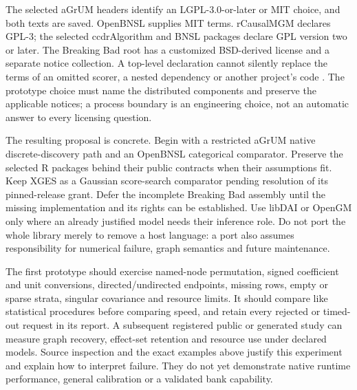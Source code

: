The selected aGrUM headers identify an LGPL-3.0-or-later or MIT choice, and
both texts are saved. OpenBNSL supplies MIT terms. rCausalMGM declares GPL-3;
the selected ccdrAlgorithm and BNSL packages declare GPL version two or
later. The Breaking Bad root has a customized BSD-derived license and a
separate notice collection. A top-level declaration cannot silently replace
the terms of an omitted scorer, a nested dependency or another project's
code \citep{exec13_cxx_agrum,exec13_cxx_openbnsl,exec13_cxx_rcausalmgm,
exec13_cxx_ccdr,exec13_cxx_bnsl,exec13_cxx_breaking}. The prototype choice
must name the distributed components and preserve the applicable notices;
a process boundary is an engineering choice, not an automatic answer to
every licensing question.

The resulting proposal is concrete. Begin with a restricted aGrUM native
discrete-discovery path and an OpenBNSL categorical comparator. Preserve
the selected R packages behind their public contracts when their assumptions
fit. Keep XGES as a Gaussian score-search comparator pending resolution of
its pinned-release grant. Defer the incomplete Breaking Bad assembly until
the missing implementation and its rights can be established. Use libDAI or
OpenGM only where an already justified model needs their inference role.
Do not port the whole library merely to remove a host language: a port also
assumes responsibility for numerical failure, graph semantics and future
maintenance.

The first prototype should exercise named-node permutation, signed
coefficient and unit conversions, directed/undirected endpoints, missing
rows, empty or sparse strata, singular covariance and resource limits. It
should compare like statistical procedures before comparing speed, and
retain every rejected or timed-out request in its report. A subsequent
registered public or generated study can measure graph recovery, effect-set
retention and resource use under declared models. Source inspection and the
exact examples above justify this experiment and explain how to interpret
failure. They do not yet demonstrate native runtime performance, general
calibration or a validated bank capability.
\label{exec13:cxx-discovery-end}
